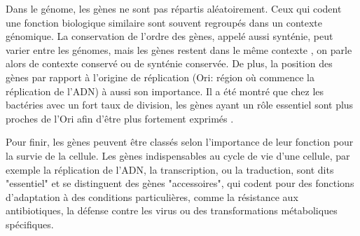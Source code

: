 Dans le génome, les gènes ne sont pas répartis aléatoirement. Ceux qui codent une fonction biologique similaire sont souvent regroupés dans un  contexte génomique. La conservation de l'ordre des gènes, appelé aussi synténie, peut varier entre les génomes, mais les gènes restent dans le même contexte \cite{lathe_gene_2000}, on parle alors de contexte conservé ou de synténie conservée. De plus, la position des gènes par rapport à l'origine de réplication (Ori: région où commence la réplication de l'ADN) à aussi son importance. Il a été montré que chez les bactéries avec un fort taux de division, les gènes ayant un rôle essentiel sont plus proches de l'Ori afin d'être plus fortement exprimés \cite{sharp_chromosomal_1989,vieira-silva_systemic_2010}.

Pour finir, les gènes peuvent être classés selon l’importance de leur fonction pour la survie de la cellule. Les gènes indispensables au cycle de vie d'une cellule, par exemple la réplication de l’ADN, la transcription, ou la traduction, sont dits "essentiel" et se distinguent des gènes "accessoires", qui codent pour des fonctions d'adaptation à des conditions particulières, comme la résistance aux antibiotiques, la défense contre les virus ou des transformations métaboliques spécifiques.





